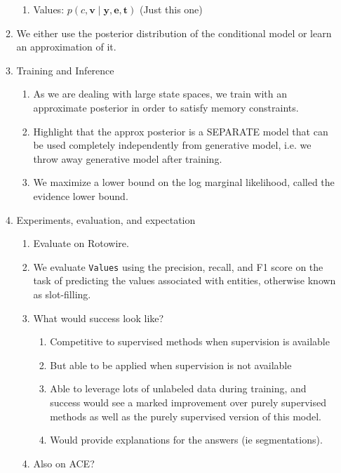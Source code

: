\documentclass[12pt]{article}
\newcommand{\be}{\mathbf{e}}
\newcommand{\br}{\mathbf{r}}
\newcommand{\bt}{\mathbf{t}}
\newcommand{\bv}{\mathbf{v}}
\newcommand{\by}{\mathbf{y}}
\begin{document}
\begin{enumerate}
\begin{enumerate}
\begin{enumerate}
        \item Values: $p(c,\bv\mid\by,\be,\bt)$ (Just this one)
        \end{enumerate}
    \item We either use the posterior distribution of the conditional model
        or learn an approximation of it.
    \item Training and Inference
        \begin{enumerate}
        \item As we are dealing with large state spaces,
            we train with an approximate posterior in order to satisfy memory constraints.
        \item Highlight that the approx posterior is a SEPARATE model
            that can be used completely independently from generative model,
            i.e. we throw away generative model after training.
        \item We maximize a lower bound on the log marginal likelihood,
            called the evidence lower bound.
        \end{enumerate}
    \item Experiments, evaluation, and expectation
        \begin{enumerate}
        \item Evaluate on Rotowire.
        \item We evaluate \texttt{Values} using the precision, recall, and F1 score on the task
            of predicting the values associated with entities, otherwise known as slot-filling.
        \item What would success look like?
            \begin{enumerate}
            \item Competitive to supervised methods when supervision is available
            \item But able to be applied when supervision is not available
            \item Able to leverage lots of unlabeled data during training,
                and success would see a marked improvement over purely supervised methods
                as well as the purely supervised version of this model.
            \item Would provide explanations for the answers (ie segmentations).
            \end{enumerate}
        \item Also on ACE?

\end{enumerate}
\end{enumerate}
\end{enumerate}
\end{document}

